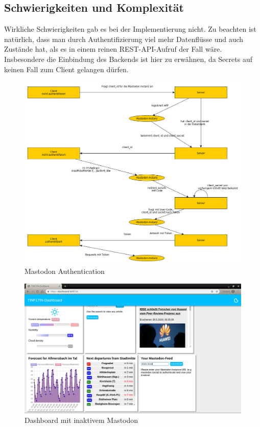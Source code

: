 \documentclass[fleqn,10pt]{SelfArx} %
\begin{document}
\subsection{Schwierigkeiten und Komplexität}
Wirkliche Schwierigkeiten gab es bei der Implementierung nicht. Zu beachten ist natürlich, dass man durch Authentifizierung viel mehr Datenflüsse und auch Zustände hat, als es in einem reinen REST-API-Aufruf der Fall wäre. Insbesondere die Einbindung des Backends ist hier zu erwähnen, da Secrets auf keinen Fall zum Client gelangen dürfen.
\begin{figure}
\includegraphics[width=\linewidth]{mastodon.jpg}
\caption{Mastodon Authentication}
\label{fig:mastodon1}
\end{figure}
\begin{figure}
	\includegraphics[width=\linewidth]{images/1.png}
	\caption{Dashboard mit inaktivem Mastodon}
	\label{fig:demo1}
\end{figure}
\end{document}

